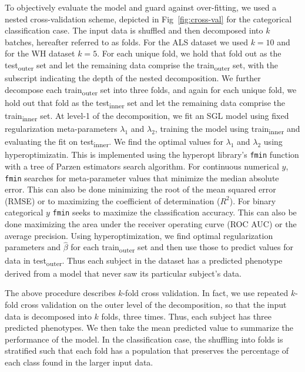 To objectively evaluate the model and guard against over-fitting, we used a
nested cross-validation scheme, depicted in Fig~\ref{fig:cross-val} for the
categorical classification case. The input data is shuffled and then decomposed
into $k$ batches, hereafter referred to as folds. For the ALS dataset we used
$k=10$ and for the WH dataset $k=5$. For each unique fold, we hold that fold out
as the test\textsubscript{outer} set and let the remaining data comprise the
train\textsubscript{outer} set, with the subscript indicating the depth of the
nested decomposition. We further decompose each train\textsubscript{outer} set
into three folds, and again for each unique fold, we hold out that fold as the
test\textsubscript{inner} set and let the remaining data comprise the
train\textsubscript{inner} set. At level-1 of the decomposition, we fit an SGL
model using fixed regularization meta-parameters $\lambda_1$ and $\lambda_2$,
training the model using train\textsubscript{inner} and evaluating the fit on
test\textsubscript{inner}. We find the optimal values for $\lambda_1$ and
$\lambda_2$ using hyperoptimizatin. This is implemented using the hyperopt
library's \verb|fmin| function\cite{Bergstra_2015} with a tree of Parzen
estimators search algorithm\cite{bergstra2011algorithms}. For continuous
numerical $y$, \verb|fmin| searches for meta-parameter values that minimize the
median absolute error. This can also be done minimizing the root of the mean
squared error (RMSE) or to maximizing the coefficient of determination ($R^2$).
For binary categorical $y$ \verb|fmin| seeks to maximize the classification
accuracy. This can also be done maximizing the area under the receiver operating
curve (ROC AUC) or the average precision. Using hyperoptimization, we find
optimal regularization parameters and $\hat{\beta}$ for each
train\textsubscript{outer} set and then use those to predict values for data in
test\textsubscript{outer}. Thus each subject in the dataset has a predicted
phenotype derived from a model that never saw its particular subject's data.

The above procedure describes $k$-fold cross validation. In fact, we use
repeated $k$-fold cross validation on the outer level of the decomposition, so
that the input data is decomposed into $k$ folds, three times. Thus, each
subject has three predicted phenotypes. We then take the mean predicted value to
summarize the performance of the model. In the classification case, the
shuffling into folds is stratified such that each fold has a population that
preserves the percentage of each class found in the larger input data.

